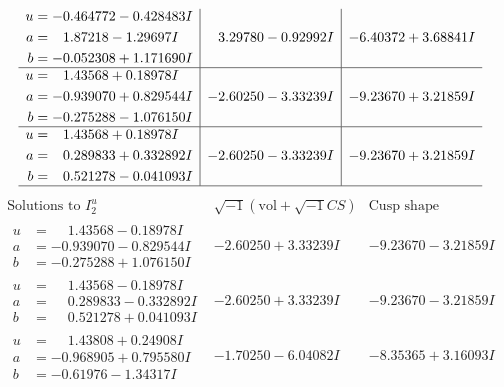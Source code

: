 \documentclass[1p]{elsarticle_modified}
\theoremstyle{definition}
\newcommand{\I}{\sqrt{-1}}
\begin{document}
$$\begin{array}{c|c|c}
\begin{aligned}
u &= -0.464772 - 0.428483 I \\
a &= \phantom{-}1.87218 - 1.29697 I \\
b &= -0.052308 + 1.171690 I\end{aligned}
 & \phantom{-}3.29780 - 0.92992 I & -6.40372 + 3.68841 I \\ \hline\begin{aligned}
u &= \phantom{-}1.43568 + 0.18978 I \\
a &= -0.939070 + 0.829544 I \\
b &= -0.275288 - 1.076150 I\end{aligned}
 & -2.60250 - 3.33239 I & -9.23670 + 3.21859 I \\ \hline\begin{aligned}
u &= \phantom{-}1.43568 + 0.18978 I \\
a &= \phantom{-}0.289833 + 0.332892 I \\
b &= \phantom{-}0.521278 - 0.041093 I\end{aligned}
 & -2.60250 - 3.33239 I & -9.23670 + 3.21859 I\\
 \hline 
 \end{array}$$\newpage$$\begin{array}{c|c|c}  
\text{Solutions to }I^u_{2}& \I (\text{vol} + \sqrt{-1}CS) & \text{Cusp shape}\\
 \hline 
\begin{aligned}
u &= \phantom{-}1.43568 - 0.18978 I \\
a &= -0.939070 - 0.829544 I \\
b &= -0.275288 + 1.076150 I\end{aligned}
 & -2.60250 + 3.33239 I & -9.23670 - 3.21859 I \\ \hline\begin{aligned}
u &= \phantom{-}1.43568 - 0.18978 I \\
a &= \phantom{-}0.289833 - 0.332892 I \\
b &= \phantom{-}0.521278 + 0.041093 I\end{aligned}
 & -2.60250 + 3.33239 I & -9.23670 - 3.21859 I \\ \hline\begin{aligned}
u &= \phantom{-}1.43808 + 0.24908 I \\
a &= -0.968905 + 0.795580 I \\
b &= -0.61976 - 1.34317 I\end{aligned}
 & -1.70250 - 6.04082 I & -8.35365 + 3.16093 I \\ \hline\begin{aligned}

\end{aligned}
\end{array}$$
\end{document}
